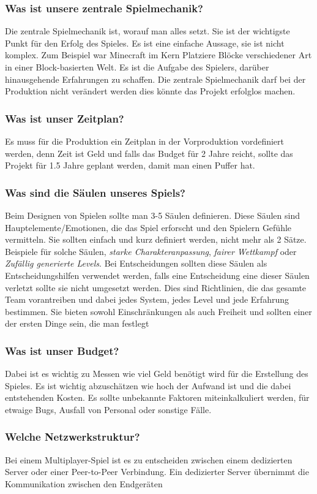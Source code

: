 \subsubsection*{Was ist unsere zentrale Spielmechanik?}
Die zentrale Spielmechanik ist, worauf man alles setzt. Sie ist der wichtigste Punkt für den Erfolg des Spieles. Es ist eine einfache Aussage, sie ist nicht komplex. Zum Beispiel war Minecraft im Kern \grqq Platziere Blöcke verschiedener Art in einer Block-basierten Welt\grqq. Es ist die Aufgabe des Spielers, darüber hinausgehende Erfahrungen zu schaffen. Die zentrale Spielmechanik darf bei der Produktion nicht verändert werden dies könnte das Projekt erfolglos machen.
\subsubsection*{Was ist unser Zeitplan?}
Es muss für die Produktion ein Zeitplan in der Vorproduktion vordefiniert werden, denn Zeit ist Geld und falls das Budget für 2 Jahre reicht, sollte das Projekt für 1.5 Jahre geplant werden, damit man einen Puffer hat.
\subsubsection*{Was sind die Säulen unseres Spiels?}
Beim Designen von Spielen sollte man 3-5 Säulen definieren. Diese Säulen sind Hauptelemente/Emotionen, die das Spiel erforscht und den Spielern Gefühle vermitteln. Sie sollten einfach und kurz definiert werden, nicht mehr als 2 Sätze. Beispiele für solche Säulen, \textit{starke Charakteranpassung}, \textit{fairer Wettkampf} oder \textit{Zufällig generierte Levels}. Bei Entscheidungen sollten diese Säulen als Entscheidungshilfen verwendet werden, falls eine Entscheidung eine dieser Säulen verletzt sollte sie nicht umgesetzt werden. Dies sind Richtlinien, die das gesamte Team vorantreiben und dabei jedes System, jedes Level und jede Erfahrung bestimmen. Sie bieten sowohl Einschränkungen als auch Freiheit und sollten einer der ersten Dinge sein, die man festlegt
\subsubsection*{Was ist unser Budget?}
Dabei ist es wichtig zu Messen wie viel Geld benötigt wird für die Erstellung des Spieles. Es ist wichtig abzuschätzen wie hoch der Aufwand ist und die dabei entstehenden Kosten. Es sollte unbekannte Faktoren miteinkalkuliert werden, für etwaige Bugs, Ausfall von Personal oder sonstige Fälle.
\subsubsection*{Welche Netzwerkstruktur?}
Bei einem Multiplayer-Spiel ist es zu entscheiden zwischen einem dedizierten Server oder einer Peer-to-Peer Verbindung. Ein dedizierter Server übernimmt die Kommunikation zwischen den Endgeräten
